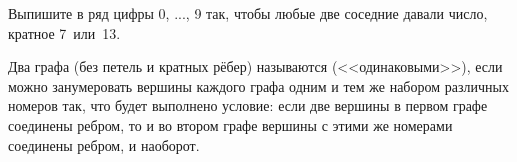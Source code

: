 \documentclass[12pt,a4paper]{article}
\begin{document}
Выпишите в ряд цифры 0, ..., 9 так, чтобы любые две соседние давали число, кратное 7~или~13.

%


Два графа (без петель и кратных рёбер) называются  (<<одинаковыми>>), если можно занумеровать вершины каждого графа одним и тем же набором различных номеров так, что %
будет выполнено условие:  если две вершины в первом графе соединены ребром, то и во втором графе вершины с этими же номерами соединены ребром, и наоборот.
\end{document}
